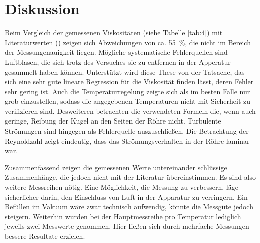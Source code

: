 \section{Diskussion}
Beim Vergleich der gemessenen Viskositäten (siehe Tabelle \ref{tab:4}) mit Literaturwerten (\cite[1]{LitEta})
zeigen sich Abweichungen von ca. \SI{55}{\percent}, die nicht im Bereich der Messungenauigkeit liegen.
Mögliche systematische Fehlerquellen sind Luftblasen, die sich trotz des Versuches sie zu entfernen in der Apperatur gesammelt
haben können. Unterstützt wird diese These von der Tatsache, das sich eine sehr gute lineare Regression
für die Viskosität finden lässt, deren Fehler sehr gering ist. Auch die Temperaturregelung zeigte sich
als im besten Falle nur grob einzustellen, sodass die angegebenen Temperaturen nicht mit Sicherheit zu
verifizieren sind. Desweiteren betrachten die verwendeten Formeln die, wenn auch geringe, Reibung der Kugel
an den Seiten der Röhre nicht.
Turbulente Strömungen sind hingegen als Fehlerquelle auszuschließen. Die Betrachtung der Reynoldzahl zeigt eindeutig, dass das
Strömungsverhalten in der Röhre laminar war.

Zusammenfassend zeigen die gemessenen Werte untereinander schlüssige Zusammenhänge, die jedoch nicht mit der Literatur übereinstimmen.
Es sind also weitere Messreihen nötig. Eine Möglichkeit, die Messung zu verbessern, läge sicherlicher darin, den Einschluss von
Luft in der Apparatur zu verringern. Ein Befüllen im Vakuum wäre zwar technisch aufwendig, könnte die Messgüte jedoch steigern.
Weiterhin wurden bei der Hauptmessreihe pro Temperatur lediglich jeweils zwei Messwerte genommen. Hier ließen sich
durch mehrfache Messungen bessere Resultate erzielen.
\newpage
\nocite{*}
\printbibliography

